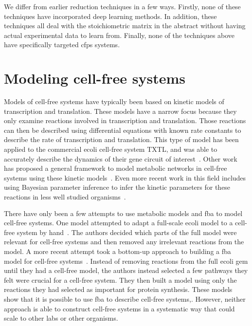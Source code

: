 We differ from earlier reduction techniques in a few ways.
Firstly, none of these techniques have incorporated deep learning methods.
In addition, these techniques all deal with the stoichiometric matrix in the abstract without having actual experimental data to learn from.
Finally, none of the techniques above have specifically targeted \gls{cfps} systems.

\section{Modeling cell-free systems}\label{rw:mod-cf}
Models of cell-free systems have typically been based on kinetic models of transcription and translation.
These models have a narrow focus because they only examine reactions involved in transcription and translation.
Those reactions can then be described using differential equations with known rate constants to describe the rate of transcription and translation.
This type of model has been applied to the commercial \gls{ecoli} cell-free system TXTL, and was able to accurately describe the dynamics of their gene circuit of interest~\cite{tuza2013silico}.
Other work has proposed a general framework to model metabolic networks in cell-free systems using these kinetic models~\cite{wayman2015dynamic}.
Even more recent work in this field includes using Bayesian parameter inference to infer the kinetic parameters for these reactions in less well studied organisms~\cite{moore2018rapid}.

There have only been a few attempts to use metabolic models and \gls{fba} to model cell-free systems.
One model attempted to adapt a full-scale \gls{ecoli} model to a cell-free system by hand~\cite{bujara2012silico}.
The authors decided which parts of the full model were relevant for cell-free systems and then removed any irrelevant reactions from the model.
A more recent attempt took a bottom-up approach to building a \gls{fba} model for cell-free systems~\cite{vilkhovoy2017sequence}.
Instead of removing reactions from the full \gls{ecoli} \gls{gem} until they had a cell-free model, the authors instead selected a few pathways they felt were crucial for a cell-free system.
They then built a model using only the reactions they had selected as important for protein synthesis.
These models show that it is possible to use \gls{fba} to describe cell-free systems,.
However, neither approach is able to construct cell-free systems in a systematic way that could scale to other labs or other organisms.

